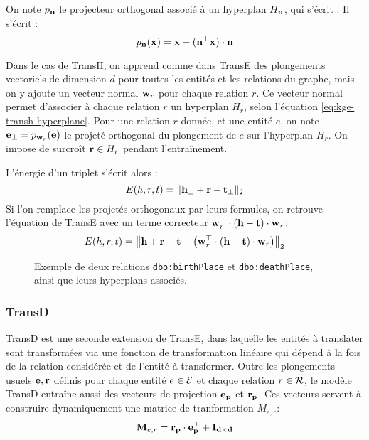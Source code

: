 On note $p_{\bf{n}}$ le projecteur orthogonal associé à un hyperplan $H_{\bf{n}}$, qui s'écrit : %
Il s'écrit :
\begin{equation}
    p_{\bf{n}}(\bf{x}) = \bf{x - (n^\top x) \cdot n}
\end{equation}

Dans le cas de TransH, on apprend comme dans TransE des plongements vectoriels de dimension $d$ pour toutes les entités et les relations du graphe, mais on y ajoute un vecteur normal $\bf{w}_r$ pour chaque relation $r$. Ce vecteur normal permet d'associer à chaque relation $r$ un hyperplan $H_r$, selon l'équation \ref{eq:kge-transh-hyperplane}.
%
Pour une relation $r$ donnée, et une entité $e$, on note $\bf{e_\bot} = p_{\bf{w}_r}(\bf{e})$ le projeté orthogonal du plongement de $e$ sur l'hyperplan $H_r$. On impose de surcroît $\bf{r} \in H_r$ pendant l'entraînement.

L'énergie d'un triplet s'écrit alors :
\begin{equation}
    E(h, r, t) = \| \bf{h_\bot + r - t_\bot} \|_2
    \label{eq:kge-transh-main}
\end{equation}
Si l'on remplace les projetés orthogonaux par leurs formules, on retrouve l'équation de TransE avec un terme correcteur $\bf{w}_r^\top \cdot (\bf{h - t}) \cdot \bf{w}_r$:
\begin{equation}
    E(h, r, t) = \left\| \bf{h + r - t} - \left( \bf{w}_r^\top \cdot (\bf{h - t}) \cdot \bf{w}_r \right) \right\|_2
    \label{eq:kge-transh-long}
\end{equation}

\begin{figure}[hbt]
    \centering
    
    \caption[Exemple des possibilités laissées par TransH]{Exemple de deux relations \texttt{dbo:birthPlace} et \texttt{dbo:deathPlace}, ainsi que leurs hyperplans associés.}
    \label{fig:transh-dual}
\end{figure}

\subsubsection{TransD \cite{transd}}

TransD est une seconde extension de TransE, dans laquelle les entités à translater sont transformées via une fonction de transformation linéaire qui dépend à la fois de la relation considérée et de l'entité à transformer. Outre les plongements usuels $\bf{e}, \bf{r}$ définis pour chaque entité $e \in \Ent $ et chaque relation $r \in \Rel$, le modèle TransD entraîne aussi des vecteurs de projection $\bf{e_p}$ et $\bf{r_p}$. Ces vecteurs servent à construire dynamiquement une matrice de tranformation $M_{e, r}$:
\begin{equation}
    \label{eq:kge-transd-matrix}
    \bf{M}_{e, r} = \bf{r_p \cdot e_p^\top + I_{d \times d}}
\end{equation}

